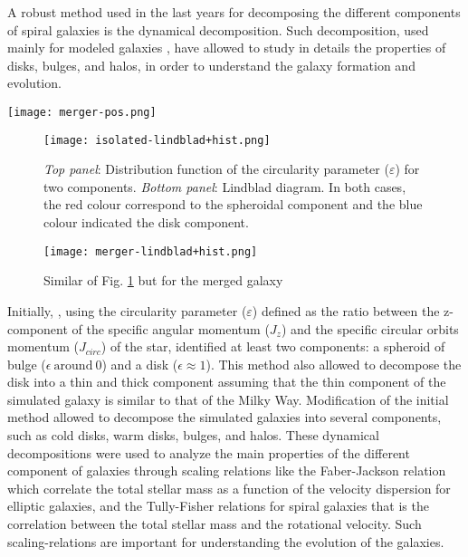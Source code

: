 \documentclass[baaa]{baaa}
\begin{document}
A robust method used in the last years for decomposing the different components of spiral galaxies is the dynamical decomposition. Such decomposition, used mainly for modeled galaxies \citep[e.g.,][]{Cristiani_2021BAAA_62_216C,Du_2019ApJ_884_129D,Abadi_2003_ApJ_597_21A}, have allowed to study in details the properties of disks, bulges, and halos, in order to understand the galaxy formation and evolution. 

\begin{figure*}[!h]
    \centering
    \texttt{[image: merger-pos.png]}
    \caption{In the upper graphs, we can observe the evolutionary stages of two Milky Way-like galaxies in the XY plane. In the lower graphs, we can observe the evolutionary stages of two Milky Way-like galaxies in the XZ plane. In both graphs, the red color represents the bulge components, and the blue color represents the disk components.}
    \label{Figura2}
\end{figure*}

\begin{figure}[!h]
    \centering
    \texttt{[image: isolated-lindblad+hist.png]}
    \caption{\emph{Top panel}: Distribution function of the circularity parameter ($\varepsilon$) for two components. \emph{Bottom panel}: Lindblad diagram. In both cases, the red colour correspond to the spheroidal component and the blue colour indicated the disk component.}
    \label{Figura3}
\end{figure}

\begin{figure}[!h]
    \centering
    \texttt{[image: merger-lindblad+hist.png]}
    \caption{Similar of Fig. \ref{Figura3} but for the merged galaxy}
    \label{Figura4}
\end{figure}

Initially, \cite{Abadi_2003_ApJ_597_21A}, using the circularity parameter ($\varepsilon$) defined as the ratio between the z-component of the specific angular momentum ($J_{z}$) and the specific circular orbits momentum ($J_{circ}$) of the star, identified at least two components: a spheroid of bulge ($\epsilon ~\text{around}~ 0$) and a disk ($\epsilon \approx 1$). This method also allowed to decompose the disk into a thin and thick component assuming that the thin component of the simulated galaxy is similar to that of the Milky Way. Modification of the initial method \citep{Du_2019ApJ_884_129D} allowed to decompose the simulated galaxies into several components, such as cold disks, warm disks, bulges, and halos. These dynamical decompositions were used to analyze the main properties of the different component of galaxies through scaling relations \citep[see][]{Cristiani_2023BAAA_64_250C} like the Faber-Jackson relation which correlate the total stellar mass as a function of the velocity dispersion for elliptic galaxies, and the Tully-Fisher relations for spiral galaxies that is the correlation between the total stellar mass and the rotational velocity. Such scaling-relations are important for understanding the evolution of the galaxies.
\end{document}

